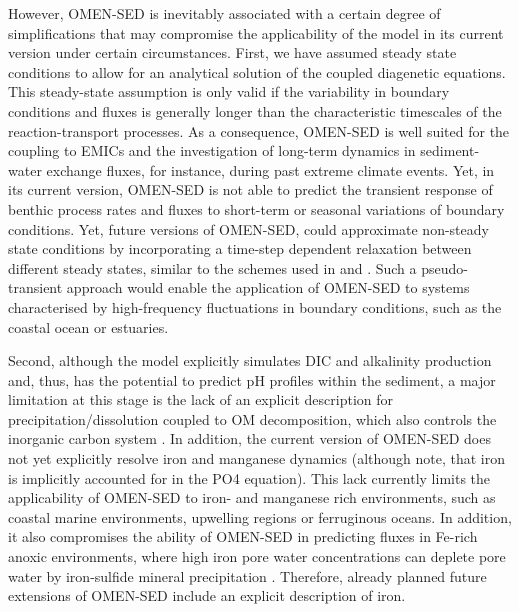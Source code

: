 \documentclass[gmd, manuscript]{copernicus}
\begin{document}
However, OMEN-SED is inevitably associated with a certain degree of simplifications that may compromise the applicability of the model in its current version under certain circumstances. 
First, we have assumed steady state conditions to allow for an analytical solution of the coupled diagenetic equations. This steady-state assumption is only valid if the variability in boundary conditions and fluxes is generally longer 
than the characteristic timescales of the reaction-transport processes. As a consequence, OMEN-SED is well suited for the coupling to EMICs and the investigation of long-term dynamics in sediment-water exchange fluxes, for instance, 
during past extreme climate events. Yet, in its current version, OMEN-SED is not able to predict the transient response of benthic process rates and fluxes to short-term or seasonal variations of boundary conditions. Yet, future versions of 
OMEN-SED, could approximate non-steady state conditions by incorporating a time-step dependent relaxation between different steady states, similar to the schemes used in \citet{ruardij_benthic_1995} and \citet{arndt_model_2007}. 
Such a pseudo-transient approach would enable the application of OMEN-SED to systems characterised by high-frequency fluctuations in boundary conditions, such as the coastal ocean or estuaries. 

Second, although the model explicitly simulates DIC and alkalinity production and, thus, has the potential to predict pH profiles within the sediment, a major limitation at this stage is the lack of an explicit description for  
precipitation/dissolution coupled to OM decomposition, which also controls the inorganic carbon system \citep{krumins_dissolved_2013}. In addition, the current version of OMEN-SED does not yet explicitly resolve iron and manganese dynamics
(although note, that iron is implicitly accounted for in the PO4 equation). This lack currently limits the applicability of OMEN-SED to iron- and manganese rich environments, such as coastal marine environments, upwelling regions or 
ferruginous oceans. In addition, it also compromises the ability of OMEN-SED in predicting  fluxes in Fe-rich anoxic environments, where high iron pore water concentrations can deplete pore water  by iron-sulfide mineral 
precipitation \citep[e.g.][]{meyers_production_2007}. Therefore, already planned future extensions of OMEN-SED include an explicit description of iron. 
\end{document}
